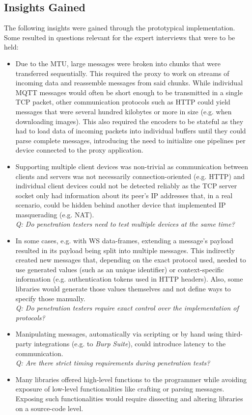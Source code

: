 \subsection{Insights Gained}
\label{sec:prototype-insights}
The following insights were gained through the prototypical implementation. Some resulted in questions relevant for the expert interviews that were to be held:
\begin{itemize}
    \item Due to the \ac{MTU}, large messages were broken into chunks that were transferred sequentially. This required the proxy to work on streams of incoming data and reassemble messages from said chunks. While individual \ac{MQTT} messages would often be short enough to be transmitted in a single \ac{TCP} packet, other communication protocols such as \ac{HTTP} could yield messages that were several hundred kilobytes or more in size (e.g. when downloading images). This also required the encoders to be stateful as they had to load data of incoming packets into individual buffers until they could parse complete messages, introducing the need to initialize one pipelines per device connected to the proxy application.
    \item Supporting multiple client devices was non-trivial as communication between clients and servers was not necessarily connection-oriented (e.g. \ac{HTTP}) and individual client devices could not be detected reliably as the \ac{TCP} server socket only had information about its peer's \ac{IP} addresses that, in a real scenario, could be hidden behind another device that implemented \ac{IP} masquerading (e.g. \ac{NAT}). \\
          \emph{Q: Do penetration testers need to test multiple devices at the same time?}
    \item In some cases, e.g. with \ac{WS} data-frames, extending a message's payload resulted in its payload being split into multiple messages. This indirectly created new messages that, depending on the exact protocol used, needed to use generated values (such as an unique identifier) or context-specific information (e.g. authentication tokens used in \ac{HTTP} headers). Also, some libraries would generate those values themselves and not define ways to specify those manually.\\
          \emph{Q: Do penetration testers require exact control over the implementation of protocols?}
    \item Manipulating messages, automatically via scripting or by hand using third-party integrations (e.g. to \emph{Burp Suite}), could introduce latency to the communication.\\
          \emph{Q: Are there strict timing requirements during penetration tests?}
    \item Many libraries offered high-level functions to the programmer while avoiding exposure of low-level functionalities like crafting or parsing messages. Exposing such functionalities would require dissecting and altering libraries on a source-code level.
\end{itemize}


